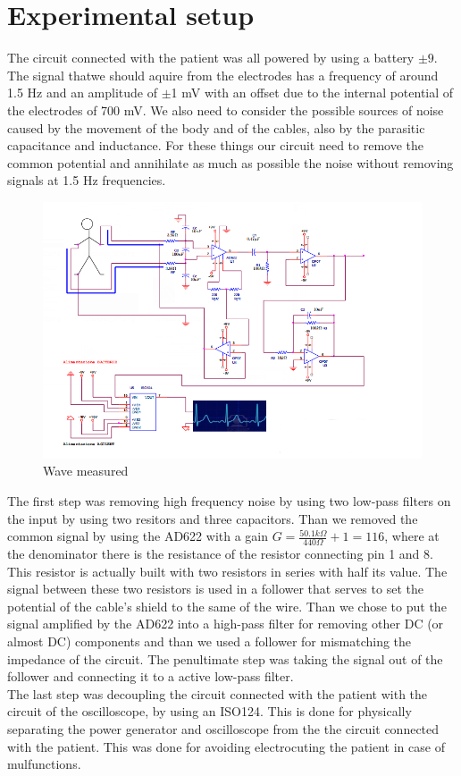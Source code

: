 \section{Experimental setup}
The circuit connected with the patient was all powered by using a battery $\pm 9$.
The signal thatwe should aquire from the electrodes has a frequency of around 1.5 Hz and an amplitude of $\pm$1 mV with an offset due to the internal potential of the electrodes of 700 mV. We also need to consider the possible sources of noise caused by the movement of the body and of the cables, also by the parasitic capacitance and inductance. For these things our circuit need to remove the common potential and annihilate as much as possible the noise without removing signals at 1.5 Hz frequencies.
\begin{figure}
\centering
\includegraphics[width=.8\textwidth]{8/circuit.png}
\caption{Wave measured}
\end{figure}
The  first step was removing high frequency noise by using two low-pass filters on the input by using two resitors and three capacitors.
Than we removed the common signal by using the AD622 with a gain $G = \frac{50.1 k\Omega}{440 \Omega} + 1 = 116$, where at the denominator there is the resistance of the resistor connecting pin 1 and 8. This resistor is actually built with two resistors in series with half its value. The signal between these two resistors is used in a follower that serves to set the potential of the cable's shield to the same of the wire. Than we chose to put the signal amplified by the AD622 into a high-pass filter for removing other DC (or almost DC) components and than we used a follower for mismatching the impedance of the circuit. The penultimate step was taking the signal out of the follower and connecting it to a active low-pass filter.\\
The last step was decoupling the circuit connected with the patient with the circuit of the oscilloscope, by using an ISO124. This is done for physically separating the power generator and oscilloscope from the the circuit connected with the patient. This was done for avoiding electrocuting the patient in case of mulfunctions.
